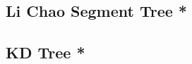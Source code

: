 \documentclass[a4paper,10pt,twocolumn,oneside]{article}
\begin{document}
% 

% 

%

% 

\subsection{Li Chao Segment Tree *}


% 

\subsection{KD Tree *}

% 

%

% 
\end{document}
